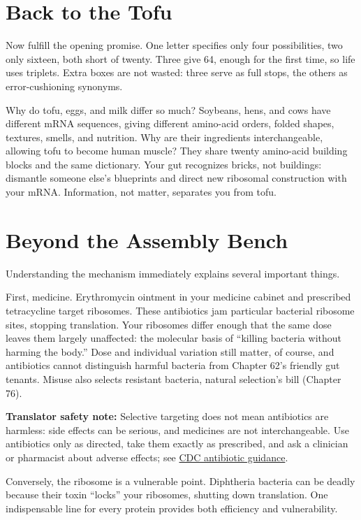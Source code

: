 \section{Back to the Tofu}

Now fulfill the opening promise. One letter specifies only four possibilities, two only sixteen, both short of twenty. Three give 64, enough for the first time, so life uses triplets. Extra boxes are not wasted: three serve as full stops, the others as error-cushioning synonyms.

Why do tofu, eggs, and milk differ so much? Soybeans, hens, and cows have different mRNA sequences, giving different amino-acid orders, folded shapes, textures, smells, and nutrition. Why are their ingredients interchangeable, allowing tofu to become human muscle? They share twenty amino-acid building blocks and the same dictionary. Your gut recognizes bricks, not buildings: dismantle someone else's blueprints and direct new ribosomal construction with your mRNA. Information, not matter, separates you from tofu.

\section{Beyond the Assembly Bench}

Understanding the mechanism immediately explains several important things.

First, medicine. Erythromycin ointment in your medicine cabinet and prescribed tetracycline target ribosomes. These antibiotics jam particular bacterial ribosome sites, stopping translation. Your ribosomes differ enough that the same dose leaves them largely unaffected: the molecular basis of ``killing bacteria without harming the body.'' Dose and individual variation still matter, of course, and antibiotics cannot distinguish harmful bacteria from Chapter 62's friendly gut tenants. Misuse also selects resistant bacteria, natural selection's bill (Chapter 76).

\textbf{Translator safety note:} Selective targeting does not mean antibiotics are harmless: side effects can be serious, and medicines are not interchangeable. Use antibiotics only as directed, take them exactly as prescribed, and ask a clinician or pharmacist about adverse effects; see \href{https://www.cdc.gov/antibiotic-use/about/}{CDC antibiotic guidance}.

Conversely, the ribosome is a vulnerable point. Diphtheria bacteria can be deadly because their toxin ``locks'' your ribosomes, shutting down translation. One indispensable line for every protein provides both efficiency and vulnerability.

